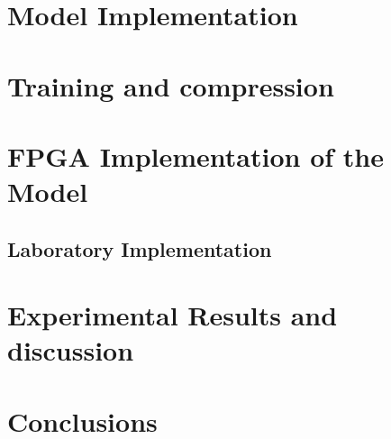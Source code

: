 \documentclass{article}
\begin{document}

\section{Model Implementation}




\section{Training and compression}




\section{FPGA Implementation of the Model}
\subsection{Laboratory Implementation}




\section{Experimental Results and discussion}





\section{Conclusions}






\end{document}
